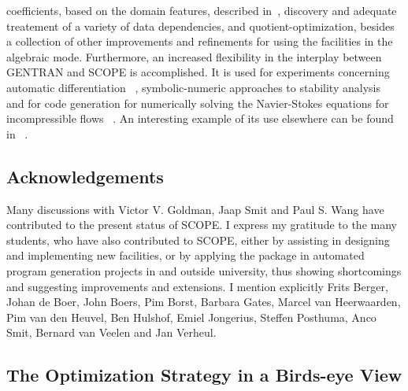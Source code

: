 coefficients, based on the domain features, described in~\cite{Bradford:86},
discovery and adequate treatement of a variety of data dependencies, and
quotient-optimization, besides a collection of other improvements and 
refinements for using the facilities in the algebraic mode. 
Furthermore, an increased flexibility in the interplay between 
GENTRAN and SCOPE is accomplished.  It is used for experiments concerning 
automatic differentiation ~\cite{Goldman:91}, symbolic-numeric approaches to
stability analysis ~\cite{Ganzha:92,Ganzha:94} and for code generation for
numerically solving the Navier-Stokes equations for incompressible 
flows ~\cite{Goldman:95}. An interesting example of its use elsewhere can be found
in ~\cite{Dyer:94}.

\subsection{Acknowledgements}\label{SCOPE:ackn}

Many discussions with Victor V. Goldman, Jaap Smit and Paul S. Wang
have contributed to the present status of SCOPE. I express my
gratitude to the many students, who have also 
contributed to SCOPE, either by assisting in designing and implementing new 
facilities, or by applying the package in automated program generation projects
in and outside university, thus showing shortcomings and suggesting 
improvements and extensions.  I mention explicitly
Frits Berger, Johan de Boer, John Boers, Pim Borst, Barbara Gates, 
Marcel van Heerwaarden, Pim van den Heuvel, Ben Hulshof, Emiel Jongerius, 
Steffen Posthuma, Anco Smit, Bernard van Veelen and Jan Verheul.

\subsection{The Optimization Strategy in a Birds-eye View}\label{SCOPE:bird}

